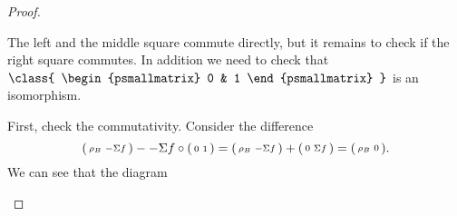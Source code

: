 \begin{proof}
\begin{enumerate}[label={(\bfseries TR\arabic*)}]
{\begin{center}
            \end{center}
            The left and the middle square commute directly, but it remains to check if the right square commutes. In addition we need to check that \( \class{
                \begin{psmallmatrix}
                    0 & 1
                \end{psmallmatrix}
            } \) is an isomorphism.

            First, check the commutativity. Consider the difference
            \[
                \begin{psmallmatrix}
                    \rho_B & -\Sigma f
                \end{psmallmatrix}
                -
                -\Sigma f \circ
                \begin{psmallmatrix}
                    0 & 1
                \end{psmallmatrix}
                =
                \begin{psmallmatrix}
                    \rho_B & -\Sigma f
                \end{psmallmatrix}
                +
                \begin{psmallmatrix}
                    0 & \Sigma f
                \end{psmallmatrix}
                =
                \begin{psmallmatrix}
                    \rho_B & 0
                \end{psmallmatrix}.
            \]
            We can see that the diagram
            \begin{center}
\end{center}}
\end{enumerate}
\end{proof}
